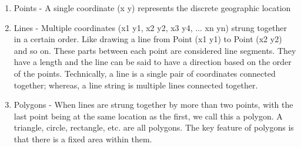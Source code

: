 \begin{enumerate}
\item Points - A single coordinate (x y) represents the discrete geographic
location
\item Lines - Multiple coordinates (x1 y1, x2 y2, x3 y4, ... xn yn) strung
together in a certain order. Like drawing a line from Point (x1 y1) to
Point
(x2 y2) and so on. These parts between each point are considered line
segments. They have a length and the line can be said to have a direction
based on the order of the points. Technically, a line is a single pair of
coordinates connected together; whereas, a line string is multiple lines
connected together.  
\item Polygons - When lines are strung together by more
than two points, with the last point being at the same location as the
first,
we call this a polygon. A triangle, circle, rectangle, etc. are all
polygons.
The key feature of polygons is that there is a fixed area within them.
\end{enumerate}

